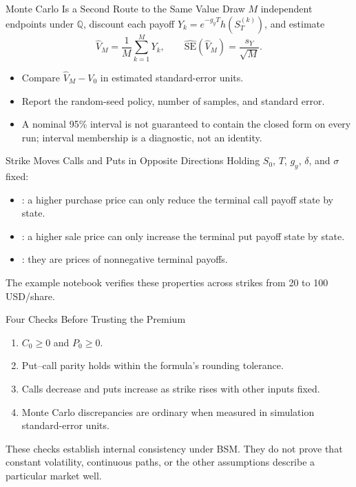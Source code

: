 \documentclass[aspectratio=169,11pt]{beamer}
\newcommand{\Q}{\mathbb{Q}}
\newcommand{\gy}{g_y}
\begin{document}
\begin{frame}{Monte Carlo Is a Second Route to the Same Value}
  Draw $M$ independent endpoints under $\Q$, discount each payoff
  $Y_k=e^{-\gy T}h(S_T^{(k)})$, and estimate
  \[
    \widehat V_M=\frac1M\sum_{k=1}^{M}Y_k,
    \qquad
    \widehat{\mathrm{SE}}(\widehat V_M)=\frac{s_Y}{\sqrt M}.
  \]
  \begin{itemize}\setlength{\itemsep}{0.35em}
    \item Compare $\widehat V_M-V_0$ in estimated standard-error units.
    \item Report the random-seed policy, number of samples, and standard error.
    \item A nominal 95\% interval is not guaranteed to contain the closed form on
      every run; interval membership is a diagnostic, not an identity.
  \end{itemize}
\end{frame}

\begin{frame}{Strike Moves Calls and Puts in Opposite Directions}
  Holding $S_0$, $T$, $\gy$, $\delta$, and $\sigma$ fixed:
  \begin{itemize}\setlength{\itemsep}{0.55em}
    \item {}: a higher purchase price can
      only reduce the terminal call payoff state by state.
    \item {}: a higher sale price can only
      increase the terminal put payoff state by state.
    \item {}: they are prices of
      nonnegative terminal payoffs.
  \end{itemize}
  \vspace{0.4em}
  The example notebook verifies these properties across strikes from 20 to 100
  USD/share.
\end{frame}

\begin{frame}{Four Checks Before Trusting the Premium}
  \begin{enumerate}\setlength{\itemsep}{0.5em}
    \item $C_0\geq0$ and $P_0\geq0$.
    \item Put--call parity holds within the formula's rounding tolerance.
    \item Calls decrease and puts increase as strike rises with other inputs fixed.
    \item Monte Carlo discrepancies are ordinary when measured in simulation
      standard-error units.
  \end{enumerate}
  \vspace{0.4em}
  These checks establish internal consistency under BSM. They do not prove that
  constant volatility, continuous paths, or the other assumptions describe a
  particular market well.
\end{frame}
\end{document}
